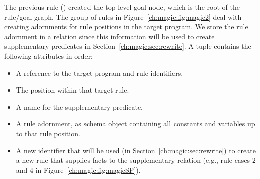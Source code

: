 The previous rule () created the top-level goal node, which is the root
of the rule/goal graph.  The group of rules in Figure~\ref{ch:magic:fig:magic2}
deal with creating adornments for rule positions in the target program.  We
store the rule adornment in a  relation since this information will be
used to create supplementary predicates in Section~\ref{ch:magic:sec:rewrite}.
A  tuple contains the following attributes in order:
\begin{itemize}
   \ssp
  \item A reference to the target program and rule identifiers. 
  \item The position within that target rule.
  \item A name for the supplementary predicate.
  \item A rule adornment, as schema object containing all constants and variables up to that rule position.
  \item A new identifier that will be used (in Section~\ref{ch:magic:sec:rewrite}) to create 
    a new rule that supplies facts to the supplementary relation (e.g., rule cases $2$ and $4$ 
    in Figure~\ref{ch:magic:fig:magicSP}).
\end{itemize}

